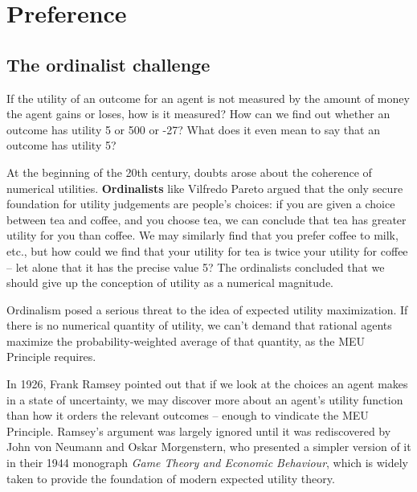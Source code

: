 \chapter{Preference}\label{ch:preference}

%

\section{The ordinalist challenge}

If the utility of an outcome for an agent is not measured by the
amount of money the agent gains or loses, how is it measured? How can
we find out whether an outcome has utility 5 or 500 or -27? What does
it even mean to say that an outcome has utility 5?

At the beginning of the 20th century, doubts arose about the coherence
of numerical utilities. \textbf{Ordinalists} like Vilfredo Pareto
argued that the only secure foundation for utility judgements are
people's choices: if you are given a choice between tea and coffee,
and you choose tea, we can conclude that tea has greater utility for
you than coffee. We may similarly find that you prefer coffee to milk,
etc., but how could we find that your utility for tea is twice your
utility for coffee -- let alone that it has the precise value 5? The
ordinalists concluded that we should give up the conception of utility
as a numerical magnitude.


Ordinalism posed a serious threat to the idea of expected utility
maximization. If there is no numerical quantity of utility, we can't
demand that rational agents maximize the probability-weighted average
of that quantity, as the MEU Principle requires.

In 1926, Frank Ramsey pointed out that if we look at the choices an
agent makes in a state of uncertainty, we may discover more about an
agent's utility function than how it orders the relevant outcomes --
enough to vindicate the MEU Principle. Ramsey's argument was largely
ignored until it was rediscovered by John von Neumann and Oskar
Morgenstern, who presented a simpler version of it in their 1944
monograph \emph{Game Theory and Economic Behaviour}, which is widely
taken to provide the foundation of modern expected utility theory.

